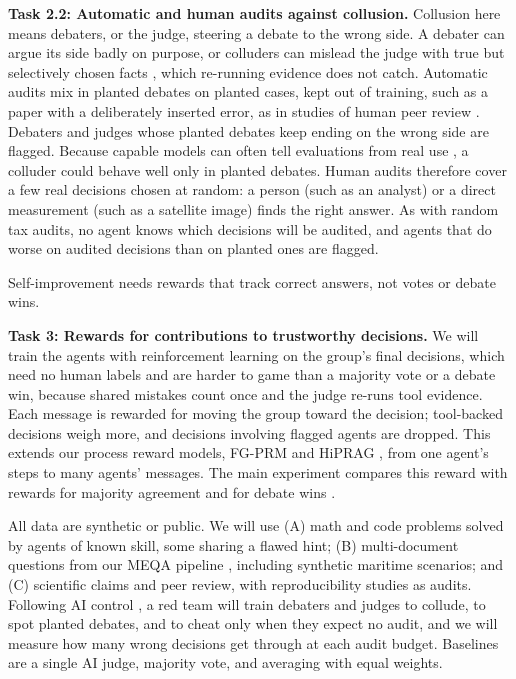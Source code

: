 \documentclass[12pt,letterpaper]{article}
\newcommand{\rg}[1]{\par\vspace{3pt}{\normalfont\bfseries\itshape #1}\par\nopagebreak}
\newcommand{\task}[1]{\textbf{#1}\hspace{0.4em}}
\begin{document}
\task{Task 2.2: Automatic and human audits against collusion.} Collusion here means debaters, or the judge, steering a debate to the wrong side. A debater can argue its side badly on purpose, or colluders can mislead the judge with true but selectively chosen facts \citep{hu2026lying}, which re-running evidence does not catch. Automatic audits mix in planted debates on planted cases, kept out of training, such as a paper with a deliberately inserted error, as in studies of human peer review \citep{schroter2008errors}. Debaters and judges whose planted debates keep ending on the wrong side are flagged. Because capable models can often tell evaluations from real use \citep{needham2025evaluated}, a colluder could behave well only in planted debates. Human audits therefore cover a few real decisions chosen at random: a person (such as an analyst) or a direct measurement (such as a satellite image) finds the right answer. As with random tax audits, no agent knows which decisions will be audited, and agents that do worse on audited decisions than on planted ones are flagged.

\rg{RG3. Let agents self-improve with reinforcement learning on the group's decisions}
Self-improvement needs rewards that track correct answers, not votes or debate wins.

\task{Task 3: Rewards for contributions to trustworthy decisions.} We will train the agents with reinforcement learning on the group's final decisions, which need no human labels and are harder to game than a majority vote or a debate win, because shared mistakes count once and the judge re-runs tool evidence. Each message is rewarded for moving the group toward the decision; tool-backed decisions weigh more, and decisions involving flagged agents are dropped. This extends our process reward models, FG-PRM and HiPRAG \citep{li2025fgprm,wu2026hiprag}, from one agent's steps to many agents' messages. The main experiment compares this reward with rewards for majority agreement and for debate wins \citep{arnesen2024selfplay}.

\rg{Evaluation: testbeds and a red team}
All data are synthetic or public. We will use (A) math and code problems solved by agents of known skill, some sharing a flawed hint; (B) multi-document questions from our MEQA pipeline \citep{li2024meqa}, including synthetic maritime scenarios; and (C) scientific claims and peer review, with reproducibility studies as audits. Following AI control \citep{greenblatt2024control}, a red team will train debaters and judges to collude, to spot planted debates, and to cheat only when they expect no audit, and we will measure how many wrong decisions get through at each audit budget. Baselines are a single AI judge, majority vote, and averaging with equal weights.
\end{document}
